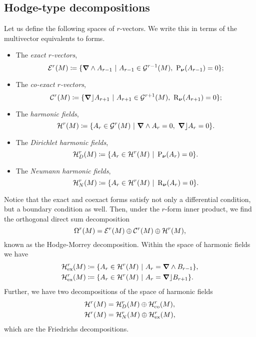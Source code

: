 \subsection{Hodge-type decompositions}
Let us define the following spaces of $r$-vectors. We write this in terms of the multivector equivalents to forms.
\begin{itemize}
    \item The \emph{exact $r$-vectors},
    \begin{equation}
        \mathcal{E}^{r}(M)\coloneqq \{\boldsymbol{\nabla} \wedge A_{r-1} ~\vert~ A_{r-1} \in \mathcal{G}^{r-1}(M), ~ \operatorname{P}_{\boldsymbol{\nu}}(A_{r-1}) = 0\};
    \end{equation}
    \item The \emph{co-exact $r$-vectors},
    \begin{equation}
        \mathcal{C}^{r}(M)\coloneqq \{\boldsymbol{\nabla} \rfloor A_{r+1} ~\vert~ A_{r+1} \in \mathcal{G}^{r+1}(M), ~ \operatorname{R}_{\boldsymbol{\nu}}(A_{r+1}) = 0\};
    \end{equation}
    \item The \emph{harmonic fields},
    \begin{equation}
        \mathcal{H}^{r}(M)\coloneqq \{A_r \in \mathcal{G}^{r}(M) ~\vert~ \boldsymbol{\nabla} \wedge A_r = 0, ~ \boldsymbol{\nabla} \rfloor A_r = 0\}.
    \end{equation}
    \item The \emph{Dirichlet harmonic fields},
    \begin{equation}
        \mathcal{H}^{r}_D(M)\coloneqq \{A_r \in \mathcal{H}^{r}(M) ~\vert~ \operatorname{P}_{\boldsymbol{\nu}}(A_r) = 0\}.
    \end{equation}
    \item The \emph{Neumann harmonic fields},
    \begin{equation}
        \mathcal{H}^{r}_N(M)\coloneqq \{A_r \in \mathcal{H}^{r}(M) ~\vert~ \operatorname{R}_{\boldsymbol{\nu}}(A_r) = 0\}.
    \end{equation}
\end{itemize}
Notice that the exact and coexact forms satisfy not only a differential condition, but a boundary condition as well. Then, under the $r$-form inner product, we find the orthogonal direct sum decomposition
\begin{equation}
\Omega^r(M) = \mathcal{E}^{r}(M) \oplus \mathcal{C}^{r}(M) \oplus \mathcal{H}^{r}(M),
\end{equation}
known as the Hodge-Morrey decomposition. Within the space of harmonic fields we have
\begin{align}
    \mathcal{H}^{r}_{\textrm{ex}}(M) &\coloneqq \{A_r \in \mathcal{H}^{r}(M) ~\vert~ A_r = \boldsymbol{\nabla} \wedge B_{r-1} \},\\
    \mathcal{H}^{r}_{\textrm{ex}}(M) &\coloneqq \{A_r \in \mathcal{H}^{r}(M) ~\vert~ A_r = \boldsymbol{\nabla} \rfloor B_{r+1} \}.
\end{align}
Further, we have two decompositions of the space of harmonic fields 
\begin{align}
    \mathcal{H}^{r}(M) &= \mathcal{H}^{r}_D(M) \oplus \mathcal{H}^{r}_{\textrm{co}}(M), \\
    \mathcal{H}^{r}(M) &= \mathcal{H}^{r}_N(M) \oplus \mathcal{H}^{r}_{\textrm{ex}}(M),
\end{align}
which are the Friedrichs decompositions.

